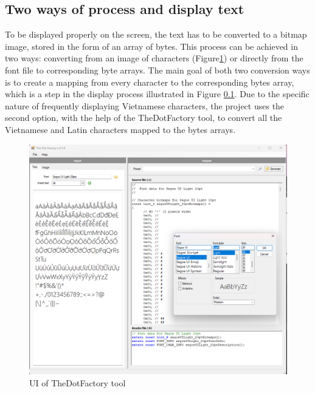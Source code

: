 \documentclass[../Main.tex]{subfiles}
\begin{document}
\subsection{Two ways of process and display text}
\label{2-ways-process}
To be displayed properly on the screen, the text has to be converted to a bitmap image, stored in the form of an array of bytes. This process can be achieved in two ways: converting from an image of characters (Figure\ref{fig:thedotfactory}) or directly from the font file to corresponding byte arrays. The main goal of both two conversion ways is to create a mapping from every character to the corresponding bytes array, which is a step in the display process illustrated in Figure \ref{2-ways-process}. Due to the specific nature of frequently displaying Vietnamese characters, the project uses the second option, with the help of the TheDotFactory tool, to convert all the Vietnamese and Latin characters mapped to the bytes arrays.
\begin{figure}[h]
    \centering
    \includegraphics[width=0.8\linewidth]{doc//thesis//EN//imgs/thedotfactory.png}
    \caption{UI of TheDotFactory tool}
    \label{fig:thedotfactory}
\end{figure}
\end{document}

